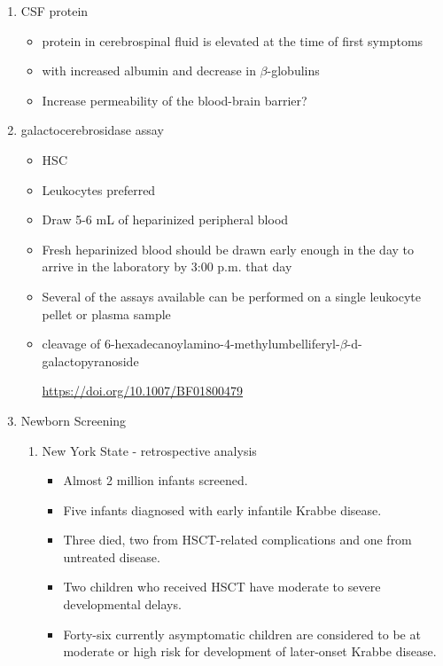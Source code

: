 \documentclass{scrartcl}
\begin{document}
\begin{enumerate}
\item CSF protein
\label{sec:orgb2a2f66}
\begin{itemize}
\item protein in cerebrospinal fluid is elevated at the time of first symptoms
\item with increased albumin and decrease in \(\beta\)-globulins
\item Increase permeability of the blood-brain barrier?
\end{itemize}

\item galactocerebrosidase assay
\label{sec:org4410b36}

\begin{itemize}
\item HSC
\item Leukocytes preferred
\item Draw 5-6 mL of heparinized peripheral blood
\item Fresh heparinized blood should be drawn early enough in the day to arrive in the laboratory by 3:00 p.m. that day
\item Several of the assays available can be performed on a single leukocyte pellet or plasma sample

\item cleavage of 6-hexadecanoylamino-4-methylumbelliferyl-\(\beta\)-d-galactopyranoside

\url{https://doi.org/10.1007/BF01800479}
\end{itemize}


\item Newborn Screening
\label{sec:org3eea5ba}
\begin{enumerate}
\item New York State - retrospective analysis
\label{sec:orgc3a54f7}
\begin{itemize}
\item Almost 2 million infants screened.
\item Five infants diagnosed with early infantile Krabbe disease.
\item Three died, two from HSCT-related complications and one from untreated disease.
\item Two children who received HSCT have moderate to severe developmental delays.
\item Forty-six currently asymptomatic children are considered to be at
moderate or high risk for development of later-onset Krabbe disease.
\end{itemize}
\end{enumerate}



\end{enumerate}
\end{document}
